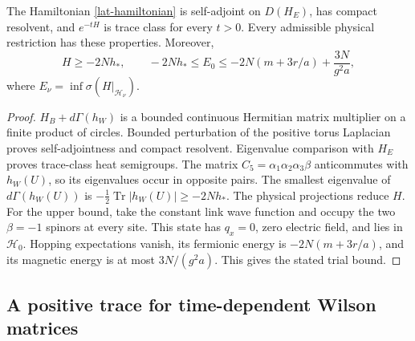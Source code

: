 \begin{lemma}
\label{lat-realization}
The Hamiltonian \eqref{lat-hamiltonian} is self-adjoint on $D(H_E)$,
has compact resolvent, and $e^{-tH}$ is trace class for every $t>0$.
Every admissible physical restriction has these properties.  Moreover,
\begin{equation}
 H\ge-2Nh_*,\qquad
 -2Nh_*\le E_0\le-2N(m+3r/a)+\frac{3N}{g^2a},
 \label{lat-extensive}
\end{equation}
where $E_\nu=\inf\sigma(H|_{\mathcal H_\nu})$.
\end{lemma}
\begin{proof}
$H_B+d\Gamma(h_W)$ is a bounded continuous Hermitian matrix multiplier
on a finite product of circles.  Bounded perturbation of the positive
torus Laplacian proves self-adjointness and compact resolvent.
Eigenvalue comparison with $H_E$ proves trace-class heat semigroups.
The matrix $C_5=\alpha_1\alpha_2\alpha_3\beta$ anticommutes with
$h_W(U)$, so its eigenvalues occur in opposite pairs.  The smallest
eigenvalue of $d\Gamma(h_W(U))$ is
$-\tfrac12\operatorname{Tr}|h_W(U)|\ge-2Nh_*$.
The physical projections reduce $H$.
For the upper bound, take the constant link wave function and occupy
the two $\beta=-1$ spinors at every site.  This state has $q_x=0$,
zero electric field, and lies in $\mathcal H_0$.  Hopping expectations
vanish, its fermionic energy is $-2N(m+3r/a)$, and its magnetic energy
is at most $3N/(g^2a)$.  This gives the stated trial bound.
\end{proof}

\subsection{A positive trace for time-dependent Wilson matrices}

